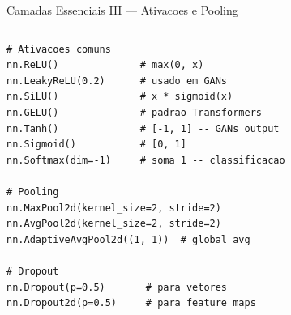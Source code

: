\documentclass[aspectratio=169, 10pt]{beamer}
\begin{document}
\begin{frame}[fragile]{Camadas Essenciais III — Ativacoes e Pooling}
\begin{columns}
\begin{lstlisting}
# Ativacoes comuns
nn.ReLU()              # max(0, x)
nn.LeakyReLU(0.2)      # usado em GANs
nn.SiLU()              # x * sigmoid(x)
nn.GELU()              # padrao Transformers
nn.Tanh()              # [-1, 1] -- GANs output
nn.Sigmoid()           # [0, 1]
nn.Softmax(dim=-1)     # soma 1 -- classificacao

# Pooling
nn.MaxPool2d(kernel_size=2, stride=2)
nn.AvgPool2d(kernel_size=2, stride=2)
nn.AdaptiveAvgPool2d((1, 1))  # global avg

# Dropout
nn.Dropout(p=0.5)       # para vetores
nn.Dropout2d(p=0.5)     # para feature maps
\end{lstlisting}

\end{columns}
\end{frame}

\end{document}
